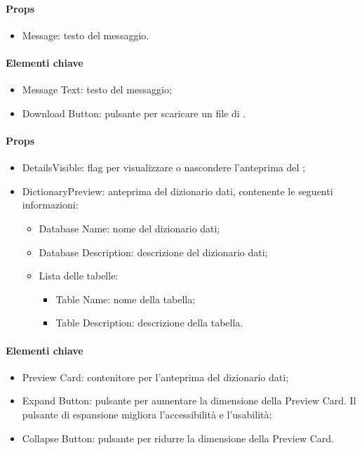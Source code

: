 \paragraph*{Props}
\begin{itemize}
  \item Message: testo del messaggio.
\end{itemize}

\paragraph*{Elementi chiave}
\begin{itemize}
  \item Message Text: testo del messaggio;
  \item Download Button: pulsante per scaricare un file di .
\end{itemize}


\paragraph*{Props}
\begin{itemize}
  \item DetailsVisible: flag per visualizzare o nascondere l'anteprima del ;
  \item DictionaryPreview: anteprima del dizionario dati, contenente le seguenti informazioni:
  \begin{itemize}
    \item Database Name: nome del dizionario dati;
    \item Database Description: descrizione del dizionario dati;
    \item Lista delle tabelle: 
    \begin{itemize}
      \item Table Name: nome della tabella;
      \item Table Description: descrizione della tabella.
    \end{itemize}
  \end{itemize}
\end{itemize}

\paragraph*{Elementi chiave}
\begin{itemize}
  \item Preview Card: contenitore per l'anteprima del dizionario dati;
  \item Expand Button: pulsante per aumentare la dimensione della Preview Card. Il pulsante di espansione migliora l'accessibilità e l'usabilità;
  \item Collapse Button: pulsante per ridurre la dimensione della Preview Card.
\end{itemize}

